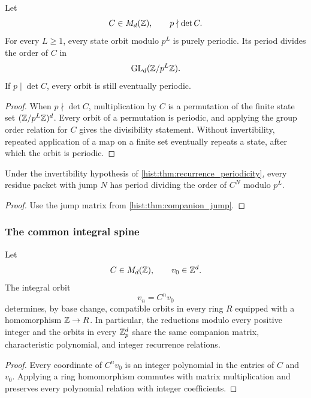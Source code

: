 \begin{histtheorem}\label{hist:thm:recurrence_periodicity}
Let
\[
C\in M_d(\mathbb Z),
\qquad
p\nmid\det C.
\]
For every \(L\geq1\), every state orbit modulo \(p^L\) is purely periodic. Its period divides the order of \(C\) in
\[
\operatorname{GL}_d(\mathbb Z/p^L\mathbb Z).
\]
If \(p\mid\det C\), every orbit is still eventually periodic.
\end{histtheorem}

\begin{proof}
When \(p\nmid\det C\), multiplication by \(C\) is a permutation of the finite state set \((\mathbb Z/p^L\mathbb Z)^d\). Every orbit of a permutation is periodic, and applying the group order relation for \(C\) gives the divisibility statement. Without invertibility, repeated application of a map on a finite set eventually repeats a state, after which the orbit is periodic.
\end{proof}

\begin{histcorollary}\label{hist:cor:residue_packet_periods}
Under the invertibility hypothesis of \cref{hist:thm:recurrence_periodicity}, every residue packet with jump \(N\) has period dividing the order of \(C^N\) modulo \(p^L\).
\end{histcorollary}

\begin{proof}
Use the jump matrix from \cref{hist:thm:companion_jump}.
\end{proof}

\subsubsection{The common integral spine}

\begin{histtheorem}\label{hist:thm:integral_recurrence_spine}
Let
\[
C\in M_d(\mathbb Z),
\qquad
v_0\in\mathbb Z^d.
\]
The integral orbit
\[
v_n=C^nv_0
\]
determines, by base change, compatible orbits in every ring \(R\) equipped with a homomorphism \(\mathbb Z\to R\). In particular, the reductions modulo every positive integer and the orbits in every \(\mathbb Z_p^d\) share the same companion matrix, characteristic polynomial, and integer recurrence relations.
\end{histtheorem}

\begin{proof}
Every coordinate of \(C^nv_0\) is an integer polynomial in the entries of \(C\) and \(v_0\). Applying a ring homomorphism commutes with matrix multiplication and preserves every polynomial relation with integer coefficients.
\end{proof}

